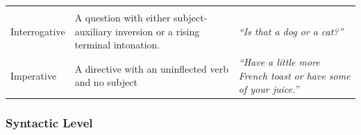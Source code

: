 \documentclass[oneside]{report}
\theoremstyle{definition}
\theoremstyle{definition}
\theoremstyle{definition}
\theoremstyle{remark}
\begin{document}
\begin{longtable}[]{@{}lll@{}}
\begin{minipage}[t]{0.32\columnwidth}
\end{minipage}\tabularnewline
\begin{minipage}[t]{0.18\columnwidth}\raggedright\strut
Interrogative\strut
\end{minipage} & \begin{minipage}[t]{0.42\columnwidth}\raggedright\strut
A question with either subject-auxiliary inversion or a rising terminal
intonation.\strut
\end{minipage} & \begin{minipage}[t]{0.32\columnwidth}\raggedright\strut
\emph{``Is that a dog or a cat?''}\strut
\end{minipage}\tabularnewline
\begin{minipage}[t]{0.18\columnwidth}\raggedright\strut
Imperative\strut
\end{minipage} & \begin{minipage}[t]{0.42\columnwidth}\raggedright\strut
A directive with an uninflected verb and no subject\strut
\end{minipage} & \begin{minipage}[t]{0.32\columnwidth}\raggedright\strut
\emph{``Have a little more French toast or have some of your
juice.''}\strut
\end{minipage}\tabularnewline
\bottomrule
\end{longtable}
\subsubsection{Syntactic Level}\label{syntactic-level}
\end{document}
